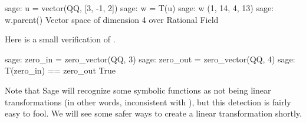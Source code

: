 %
\begin{sageexample}
sage: u = vector(QQ, [3, -1, 2])
sage: w = T(u)
sage: w
(1, 14, 4, 13)
sage: w.parent()
Vector space of dimension 4 over Rational Field
\end{sageexample}
%
Here is a small verification of .
%
\begin{sageexample}
sage: zero_in = zero_vector(QQ, 3)
sage: zero_out = zero_vector(QQ, 4)
sage: T(zero_in) == zero_out
True
\end{sageexample}
%
Note that Sage will recognize some symbolic functions as not being linear transformations (in other words, inconsistent with ), but this detection is fairly easy to fool.  We will see some safer ways to create a linear transformation shortly.
%
\begin{sageverbatim}
\end{sageverbatim}
%
